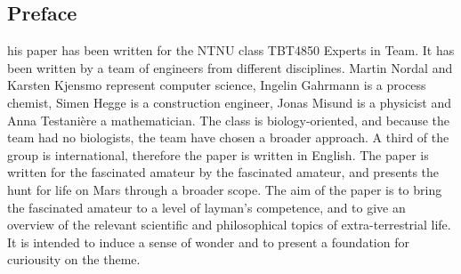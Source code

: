 \subsection{Preface}
his paper has been written for the NTNU class TBT4850 Experts in Team.
It has been written by a team of engineers from different disciplines.
Martin Nordal and Karsten Kjensmo represent computer science, Ingelin Gahrmann is a process chemist, Simen Hegge is a construction engineer, Jonas Misund is a physicist and Anna Testani\`{e}re a mathematician.
The class is biology-oriented, and because the team had no biologists, the team have chosen a broader approach. A third of the group is international, therefore the paper is written in English. 
The paper is written for the fascinated amateur by the fascinated amateur, and presents the hunt for life on Mars through a broader scope.
The aim of the paper is to bring the fascinated amateur to a level of layman's competence, and to give an overview of the relevant scientific and philosophical topics of extra-terrestrial life.
It is intended to induce a sense of wonder and to present a foundation for curiousity on the theme.